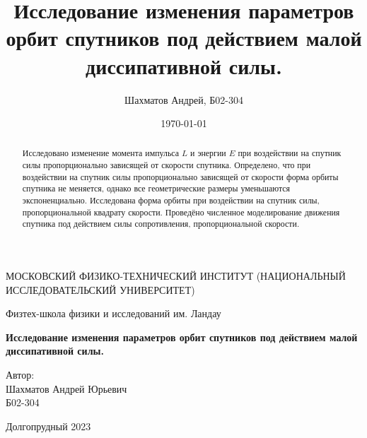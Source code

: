 \documentclass[12pt]{article}
\title{Исследование изменения параметров орбит спутников под действием малой диссипативной силы.}
\author{Шахматов Андрей, Б02-304}
\date{\today}
\begin{document}
\begin{titlepage}
    \begin{center}
        {\large МОСКОВСКИЙ ФИЗИКО-ТЕХНИЧЕСКИЙ ИНСТИТУТ (НАЦИОНАЛЬНЫЙ ИССЛЕДОВАТЕЛЬСКИЙ УНИВЕРСИТЕТ)}
    \end{center}
    \begin{center}
        {\large Физтех-школа физики и исследований им. Ландау}
    \end{center}
    
    
    \vspace{3cm}
    {\huge
        \begin{center}
            \textbf{Исследование изменения параметров орбит спутников под действием малой диссипативной силы.}
        \end{center}
    }
    \vspace{2cm}
    \begin{flushright}
        {\LARGE Автор:\\ Шахматов Андрей Юрьевич \\
            \vspace{0.2cm}
            Б02-304}
    \end{flushright}
    \vspace{7 cm}
    \begin{center}
        Долгопрудный 2023
    \end{center}
\end{titlepage}


\begin{abstract}
    Исследовано изменение момента импульса $L$ и энергии $E$ при воздействии на спутник силы пропорционально зависящей от скорости спутника.
    Определено, что при воздействии на спутник силы пропорционально зависящей от скорости форма орбиты спутника не меняется, однако 
    все геометрические размеры уменьшаются экспоненциально. Исследована форма орбиты при воздействии на спутник силы, пропорциональной 
    квадрату скорости. Проведёно численное моделирование движения спутника под действием силы сопротивления, пропорциональной скорости.

\end{abstract}

\tableofcontents
\end{document}
